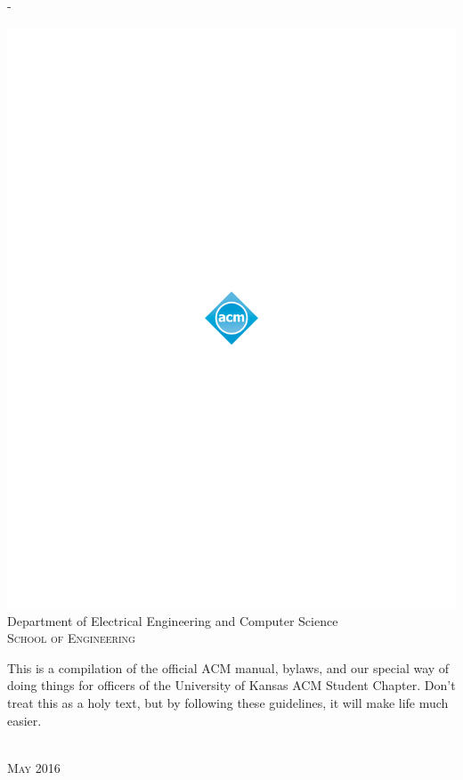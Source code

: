 \begin{titlingpage}
\begin{SingleSpace}
\begin{adjustwidth*}{\unitlength}{-\unitlength}
\begin{center}
\includegraphics[scale=1.8]{logos/acm_sym_1s_grad_pos}\\
\vspace{6mm}
{\large Department of Electrical Engineering and Computer Science\\
\textsc{School of Engineering}}\\
\vspace{11mm}
\begin{minipage}{10cm}
This is a compilation of the official ACM manual, bylaws, and our special way of
doing things for officers of the University of Kansas ACM Student Chapter. Don't
treat this as a holy text, but by following these guidelines, it will make life
much easier.
\end{minipage}\\
\vspace{9mm}
{\large\textsc{May 2016}}
\vspace{12mm}
\end{center}
\end{adjustwidth*}
\end{SingleSpace}
\end{titlingpage}
